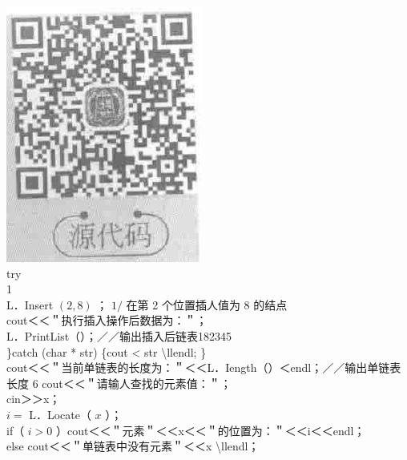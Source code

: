 \documentclass[10pt]{article}
\begin{document}
\includegraphics[max width=\textwidth, center]{2025_06_06_704745ea57b15b2333e5g-061(1)}\\
try\\
1\\
L．Insert $(2,8)$ ； $1 /$ 在第 2 个位置插人值为 8 的结点\\
cout＜＜＂执行插入操作后数据为：＂；\\
L．PrintList（）；／／输出插入后链表182345\\
\}catch (char * str) \{cout < str \textbackslash llendl; \}\\
cout＜＜＂当前单链表的长度为：＂＜＜L．Iength（）＜endl；／／输出单链表长度 6 cout＜＜＂请输人查找的元素值：＂；\\
cin＞＞x；\\
$i=$ L．Locate（ $x$ ）；\\
if（ $i>0$ ）cout＜＜＂元素＂＜＜x＜＜＂的位置为：＂＜＜i＜＜endl；\\
else cout＜＜＂单链表中没有元素＂＜＜x \textbackslash llendl；
\end{document}
